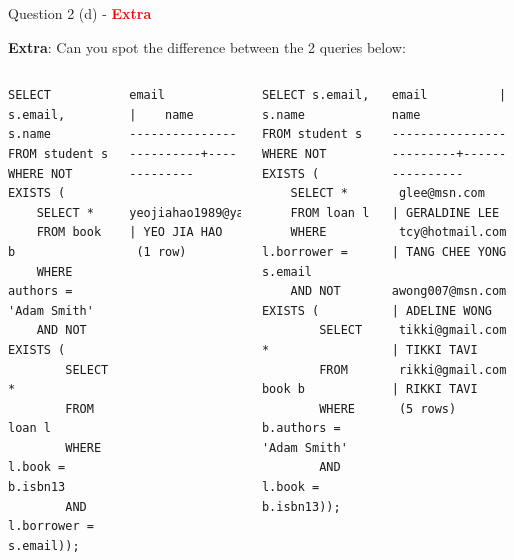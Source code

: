 \begin{frame}[fragile]{Question 2 (d) - \textcolor{red}{\textbf{Extra}}}


\textbf{Extra}: Can you spot the difference between the 2 queries below:
\begin{columns}[t]
\begin{lstlisting}[style=sql-small]
SELECT s.email, s.name
FROM student s
WHERE NOT EXISTS (
	SELECT * 
	FROM book b
	WHERE authors = 'Adam Smith' 
	AND NOT EXISTS (
		SELECT * 
		FROM loan l
		WHERE l.book = b.isbn13 
		AND l.borrower = s.email));
\end{lstlisting}
\begin{lstlisting}[style=terminal-tiny]	
          email          |    name
-------------------------+-------------
 yeojiahao1989@yahoo.com | YEO JIA HAO
 (1 row)	
\end{lstlisting}

\begin{lstlisting}[style=sql-small]
SELECT s.email, s.name
FROM student s
WHERE NOT EXISTS (
	SELECT * 
	FROM loan l
	WHERE l.borrower = s.email
	AND NOT EXISTS (
		SELECT *
		FROM book b
		WHERE b.authors = 'Adam Smith'
		AND l.book = b.isbn13));
\end{lstlisting}

\begin{lstlisting}[style=terminal-tiny]
          email          |      name
-------------------------+----------------
 glee@msn.com            | GERALDINE LEE
 tcy@hotmail.com         | TANG CHEE YONG
 awong007@msn.com        | ADELINE WONG
 tikki@gmail.com         | TIKKI TAVI
 rikki@gmail.com         | RIKKI TAVI
 (5 rows)
\end{lstlisting}
\end{columns}

\end{frame}

